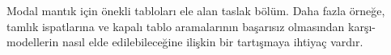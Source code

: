 \documentclass[../../../include/open-logic-chapter]{subfiles}
\begin{document}

\begin{editorial}
  Modal mantık için önekli tabloları ele alan taslak bölüm. Daha fazla örneğe,
  tamlık ispatlarına ve kapalı tablo aramalarının başarısız olmasından
  karşı-modellerin nasıl elde edilebileceğine ilişkin bir tartışmaya ihtiyaç
  vardır.
\end{editorial}


\OLEndChapterHook
\end{document}
